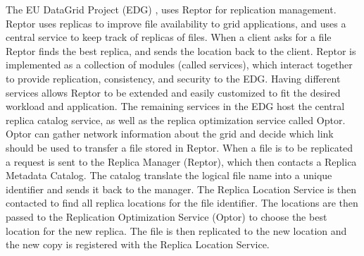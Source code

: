 The EU DataGrid Project (EDG) \cite{Kunszt2005}, \cite{Cameron2004} uses
Reptor \cite{Kunszt2004} for replication management. Reptor uses replicas to
improve file availability to grid applications, and uses a central service to
keep track of replicas of files. When a client asks for a file Reptor finds
the best replica, and sends the location back to the client. Reptor is
implemented as a collection of modules (called services), which interact
together to provide replication, consistency, and security to the EDG. Having
different services allows Reptor to be extended and easily customized to fit
the desired workload and application. The remaining services in the EDG host
the central replica catalog service, as well as the replica optimization
service called Optor. Optor can gather network information about the grid and
decide which link should be used to transfer a file stored in Reptor. When a
file is to be replicated a request is sent to the Replica Manager (Reptor),
which then contacts a Replica Metadata Catalog. The catalog translate the
logical file name into a unique identifier and sends it back to the manager.
The Replica Location Service is then contacted to find all replica locations
for the file identifier. The locations are then passed to the Replication
Optimization Service (Optor) to choose the best location for the new replica.
The file is then replicated to the new location and the new copy is registered
with the Replica Location Service.


